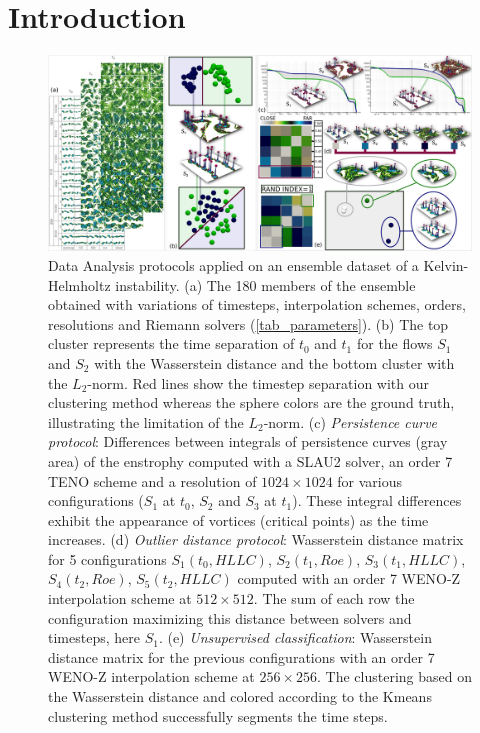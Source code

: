 \section{Introduction}

\begin{figure}
 \centering
 \includegraphics[width=1\linewidth]{chapter4_topology_data_analysis/pictures/teaser2.jpg}
 \caption{ Data Analysis protocols
applied
  on an ensemble dataset of a Kelvin-Helmholtz instability.
(a) The 180 members of the ensemble obtained with variations of timesteps, interpolation schemes, orders, resolutions and Riemann solvers (\autoref{tab_parameters}).
(b) The top cluster represents the time separation of $t_0$ and $t_1$ for the
flows $S_1$ and $S_2$ with the Wasserstein distance and the bottom cluster with
the $L_2$-norm. Red lines show the timestep separation with our clustering
method whereas the sphere colors are the ground truth, illustrating the
limitation of the $L_2$-norm.
(c) \textit{Persistence curve protocol}: Differences between integrals of persistence curves (gray area) of the enstrophy computed with a SLAU2 solver, an order 7 TENO scheme and a resolution of $1024\times 1024$ for various configurations ($S_1$ at $t_0$, $S_2$ and $S_3$ at $t_1$). These integral differences exhibit the appearance of vortices (critical points) as the time increases.
(d) \textit{Outlier distance protocol}: Wasserstein distance matrix for 5 configurations $S_1(t_0,HLLC)$, $S_2(t_1,Roe)$, $S_3(t_1,HLLC)$, $S_4(t_2,Roe)$, $S_5(t_2,HLLC)$ computed with an order 7 WENO-Z interpolation scheme at $512\times 512$.
The sum of each row
the configuration maximizing this distance between solvers and timesteps, here $S_1$.
(e) \textit{Unsupervised classification}: Wasserstein distance matrix for the
previous configurations with an order 7 WENO-Z interpolation scheme at
$256\times 256$. The clustering based on the Wasserstein distance and colored
according to the Kmeans clustering method successfully segments the time
steps.}
 \label{fig_teaser}
\end{figure}

